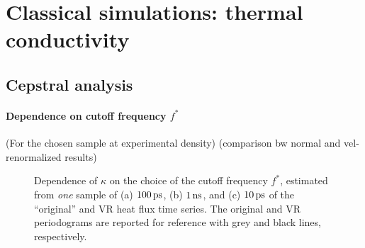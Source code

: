 \section{Classical simulations: thermal conductivity}

\subsection{Cepstral analysis}
\paragraph{Dependence on cutoff frequency $f^*$}
(For the chosen sample at experimental density)
(comparison bw normal and vel-renormalized results)

\begin{figure}
    \centering
    \caption{Dependence of $\kappa$ on the choice of the cutoff frequency $f^*$, estimated from \emph{one} sample of (a) $100\,\mathrm{ps}$, (b) $1\,\mathrm{ns}$, and (c) $10\,\mathrm{ps}$ of the ``original'' and VR heat flux time series. 
    The original and VR periodograms are reported for reference with grey and black lines, respectively.}
    \label{fig:csilica-sample-expdens-fstar}
\end{figure}
